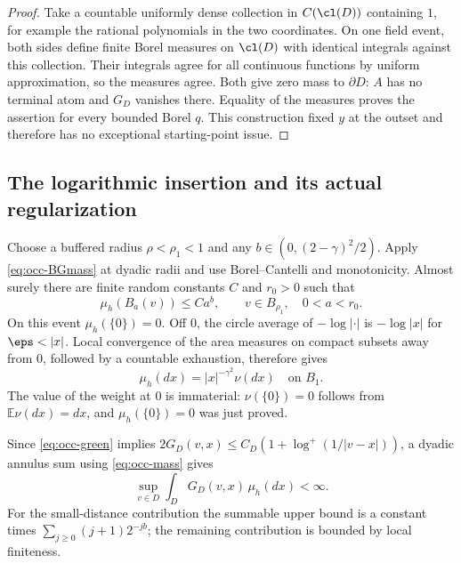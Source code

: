 \begin{proof}
Take a countable uniformly dense collection in $C(\cl(D))$ containing
$1$, for example the rational polynomials in the two coordinates.
On one field event, both sides define finite Borel measures on
$\cl(D)$ with identical integrals against this collection. Their
integrals agree for all continuous functions by uniform approximation,
so the measures agree. Both give zero mass to $\partial D$:
$A$ has no terminal atom and $G_D$ vanishes there.
Equality of the measures proves the assertion for every bounded Borel
$q$. This construction fixed $y$ at the outset and therefore has no
exceptional starting-point issue.
\end{proof}

\subsection{The logarithmic insertion and its actual regularization}

Choose a buffered radius $\rho<\rho_1<1$ and any
$b\in(0,(2-\gamma)^2/2)$. Apply \eqref{eq:occ-BGmass} at dyadic radii and
use Borel--Cantelli and monotonicity. Almost surely there are finite
random constants $C$ and $r_0>0$ such that
\begin{equation}\label{eq:occ-mass}
 \mu_h(B_a(v))\leq C a^b,\qquad
 v\in B_{\rho_1},\quad 0<a<r_0.
\end{equation}
On this event $\mu_h(\{0\})=0$. Off $0$, the circle average of
$-\log|\cdot|$ is $-\log|x|$ for $\eps<|x|$. Local convergence of
the area measures on compact subsets away from $0$, followed by a
countable exhaustion, therefore gives
\begin{equation}\label{eq:occ-weight}
 \mu_h(dx)=|x|^{-\gamma^2}\nu(dx)\quad\text{on }B_1.
\end{equation}
The value of the weight at $0$ is immaterial: $\nu(\{0\})=0$ follows
from $\mathbb{E}\nu(dx)=dx$, and $\mu_h(\{0\})=0$ was just proved.

Since \eqref{eq:occ-green} implies
$2G_D(v,x)\leq C_D(1+\log^+(1/|v-x|))$, a dyadic annulus sum using
\eqref{eq:occ-mass} gives
\begin{equation}\label{eq:occ-potential}
 \sup_{v\in D}\int_DG_D(v,x)\,\mu_h(dx)<\infty .
\end{equation}
For the small-distance contribution the summable upper bound is a
constant times $\sum_{j\geq0}(j+1)2^{-jb}$; the remaining contribution
is bounded by local finiteness.

